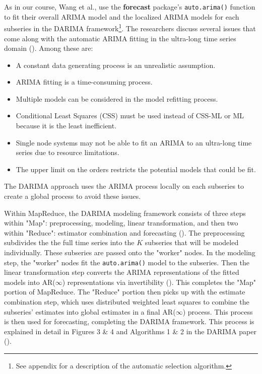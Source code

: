 \documentclass[
]{article}
\begin{document}
As in our course, Wang et al., use the \textbf{forecast} package's \texttt{auto.arima()} function to fit their overall ARIMA model and the localized ARIMA models for each subseries in the DARIMA framework\footnote{See appendix for a description of the automatic selection algorithm.}. The researchers discuss several issues that come along with the automatic ARIMA fitting in the ultra-long time series domain (\cite[p.~9-10]{wang_distributed_2020}). Among these are:
\begin{itemize}
  \item A constant data generating process is an unrealistic assumption.
  \item ARIMA fitting is a time-consuming process.
  \item Multiple models can be considered in the model refitting process.
  \item Conditional Least Squares (CSS) must be used instead of CSS-ML or ML because it is the least inefficient.
  \item Single node systems may not be able to fit an ARIMA to an ultra-long time series due to resource limitations.
  \item The upper limit on the orders restricts the potential models that could be fit.
\end{itemize} The DARIMA approach uses the ARIMA process locally on each subseries to create a global process to avoid these issues.

Within MapReduce, the DARIMA modeling framework consists of three steps within "Map": preprocessing, modeling, linear transformation, and then two within "Reduce": estimator combination and forecasting (\cite[p.~13-14]{wang_distributed_2020}). The preprocessing subdivides the the full time series into the $K$ subseries that will be modeled individually. These subseries are passed onto the "worker" nodes. In the modeling step, the "worker" nodes fit the \texttt{auto.arima()} model to the subseries. Then the linear transformation step converts the ARIMA representations of the fitted models into AR($\infty$) representations via invertibility (\cite[p.~16]{wang_distributed_2020}). This completes the "Map" portion of MapReduce. The "Reduce" portion then picks up with the estimate combination step, which uses distributed weighted least squares to combine the subseries' estimates into global estimates in a final AR($\infty$) process. This process is then used for forecasting, completing the DARIMA framework. This process is explained in detail in Figures 3 \& 4 and Algorithms 1 \& 2 in the DARIMA paper (\cite[p.~13-15]{wang_distributed_2020}).
\end{document}
